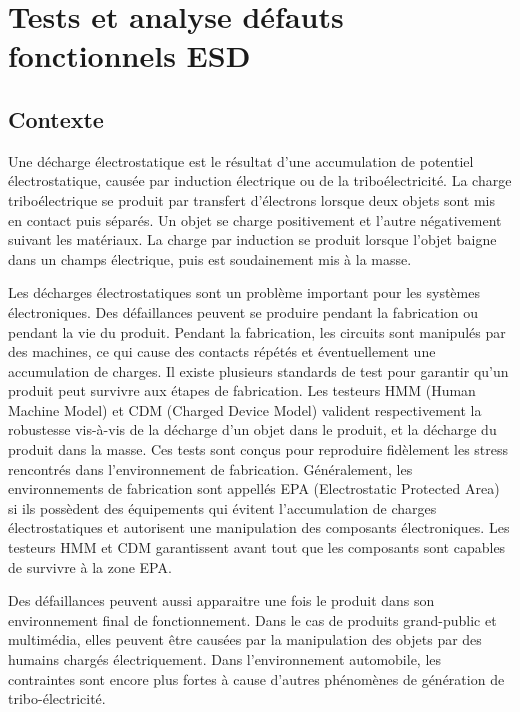 \chapter{Tests et analyse défauts fonctionnels ESD}
\label{chap:1}
\section{Contexte}

Une décharge électrostatique est le résultat d'une accumulation de potentiel électrostatique, causée par induction électrique ou de la triboélectricité.
La charge triboélectrique se produit par transfert d'électrons lorsque deux objets sont mis en contact puis séparés.
Un objet se charge positivement et l'autre négativement suivant les matériaux.
La charge par induction se produit lorsque l'objet baigne dans un champs électrique, puis est soudainement mis à la masse.

Les décharges électrostatiques sont un problème important pour les systèmes électroniques.
Des défaillances peuvent se produire pendant la fabrication ou pendant la vie du produit.
Pendant la fabrication, les circuits sont manipulés par des machines, ce qui cause des contacts répétés et éventuellement une accumulation de charges.
Il existe plusieurs standards de test pour garantir qu'un produit peut survivre aux étapes de fabrication.
Les testeurs HMM (Human Machine Model) et CDM (Charged Device Model) valident respectivement la robustesse vis-à-vis de la décharge d'un objet dans le produit, et la décharge du produit dans la masse.
Ces tests sont conçus pour reproduire fidèlement les stress rencontrés dans l'environnement de fabrication.
Généralement, les environnements de fabrication sont appellés EPA (Electrostatic Protected Area) si ils possèdent des équipements qui évitent l'accumulation de charges électrostatiques et autorisent une manipulation des composants électroniques.
Les testeurs HMM et CDM garantissent avant tout que les composants sont capables de survivre à la zone EPA.

Des défaillances peuvent aussi apparaitre une fois le produit dans son environnement final de fonctionnement.
Dans le cas de produits grand-public et multimédia, elles peuvent être causées par la manipulation des objets par des humains chargés électriquement.
Dans l'environnement automobile, les contraintes sont encore plus fortes à cause d'autres phénomènes de génération de tribo-électricité.

